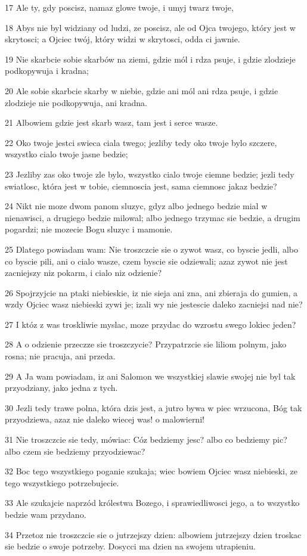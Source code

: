 \par 17 Ale ty, gdy poscisz, namaz glowe twoje, i umyj twarz twoje,
\par 18 Abys nie byl widziany od ludzi, ze poscisz, ale od Ojca twojego, który jest w skrytosci; a Ojciec twój, który widzi w skrytosci, odda ci jawnie.
\par 19 Nie skarbcie sobie skarbów na ziemi, gdzie mól i rdza psuje, i gdzie zlodzieje podkopywuja i kradna;
\par 20 Ale sobie skarbcie skarby w niebie, gdzie ani mól ani rdza psuje, i gdzie zlodzieje nie podkopywuja, ani kradna.
\par 21 Albowiem gdzie jest skarb wasz, tam jest i serce wasze.
\par 22 Oko twoje jestci swieca ciala twego; jezliby tedy oko twoje bylo szczere, wszystko cialo twoje jasne bedzie;
\par 23 Jezliby zas oko twoje zle bylo, wszystko cialo twoje ciemne bedzie; jezli tedy swiatlosc, która jest w tobie, ciemnoscia jest, sama ciemnosc jakaz bedzie?
\par 24 Nikt nie moze dwom panom sluzyc, gdyz albo jednego bedzie mial w nienawisci, a drugiego bedzie milowal; albo jednego trzymac sie bedzie, a drugim pogardzi; nie mozecie Bogu sluzyc i mamonie.
\par 25 Dlatego powiadam wam: Nie troszczcie sie o zywot wasz, co byscie jedli, albo co byscie pili, ani o cialo wasze, czem byscie sie odziewali; azaz zywot nie jest zacniejszy niz pokarm, i cialo niz odzienie?
\par 26 Spojrzyjcie na ptaki niebieskie, iz nie sieja ani zna, ani zbieraja do gumien, a wzdy Ojciec wasz niebieski zywi je; izali wy nie jestescie daleko zacniejsi nad nie?
\par 27 I któz z was troskliwie myslac, moze przydac do wzrostu swego lokiec jeden?
\par 28 A o odzienie przeczze sie troszczycie? Przypatrzcie sie liliom polnym, jako rosna; nie pracuja, ani przeda.
\par 29 A Ja wam powiadam, iz ani Salomon we wszystkiej slawie swojej nie byl tak przyodziany, jako jedna z tych.
\par 30 Jezli tedy trawe polna, która dzis jest, a jutro bywa w piec wrzucona, Bóg tak przyodziewa, azaz nie daleko wiecej was! o malowierni!
\par 31 Nie troszczcie sie tedy, mówiac: Cóz bedziemy jesc? albo co bedziemy pic? albo czem sie bedziemy przyodziewac?
\par 32 Boc tego wszystkiego poganie szukaja; wiec bowiem Ojciec wasz niebieski, ze tego wszystkiego potrzebujecie.
\par 33 Ale szukajcie naprzód królestwa Bozego, i sprawiedliwosci jego, a to wszystko bedzie wam przydano.
\par 34 Przetoz nie troszczcie sie o jutrzejszy dzien: albowiem jutrzejszy dzien troskac sie bedzie o swoje potrzeby. Dosycci ma dzien na swojem utrapieniu.


